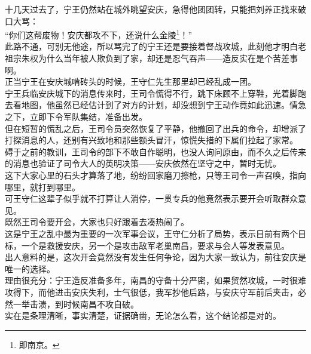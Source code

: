 \begin{multicols}{\theparacolNo}
十几天过去了，宁王仍然站在城外眺望安庆，急得他团团转，只能把刘养正找来破口大骂：\\

“你们这帮废物！安庆都攻不下，还说什么金陵\footnote{即南京。}！”\\

此路不通，可别无他途，所以骂完了的宁王还是要接着督战攻城，此刻他才明白老祖宗朱权为什么当年被人欺负到了家，却还是忍气吞声——造反实在是个苦差事啊。\\

正当宁王在安庆城啃砖头的时候，王守仁先生那里却已经乱成一团。\\

宁王兵临安庆城下的消息传来时，王司令慌得不行，跳下床顾不上穿鞋，光着脚跑去看地图，他虽然已经估计到了对方的计划，却没想到宁王动作竟如此迅速。情急之下，立即下令军队集结，准备出发。\\

但在短暂的慌乱之后，王司令员突然恢复了平静，他撤回了出兵的命令，却增派了打探消息的人，还别有兴致地和那些额头冒汗，惊慌失措的下属们拉起了家常。\\

碍于之前的教训，王司令的部下不敢自作聪明，也没人询问原由，而不久之后传来的消息也验证了司令大人的英明决策——安庆依然在坚守之中，暂时无忧。\\

这下大家心里的石头才算落了地，纷纷回家磨刀擦枪，只等王司令一声召唤，指向哪里，就打到哪里。\\

可王守仁这辈子似乎就不打算让人消停，一贯专兵的他竟然表示要开会听取群众意见。\\

既然王司令要开会，大家也只好跟着去凑热闹了。\\

这是宁王之乱中最为重要的一次军事会议，王守仁分析了局势，表示目前有两个目标，一个是救援安庆，另一个是攻击敌军老巢南昌，要求与会人等发表意见。\\

出人意料的是，这次开会竟然没有发生任何争论，因为大家一致认为，前往安庆是唯一的选择。\\

理由很充分：宁王造反准备多年，南昌的守备十分严密，如果贸然攻城，一时很难攻得下，而他进击安庆失利，士气很低，我军抄他后路，与安庆守军前后夹击，必然一举击溃，到时候南昌不攻自破。\\

实在是条理清晰，事实清楚，证据确凿，无论怎么看，这个结论都是对的。\\


\end{multicols}
